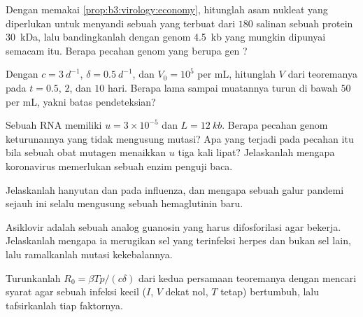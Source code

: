 \begin{exercise}[$\star\star$]\label{exo:b3:virology:5}
Dengan memakai \cref{prop:b3:virology:economy}, hitunglah asam nukleat yang
diperlukan untuk menyandi  sebuah  yang terbuat dari $180$ salinan
sebuah protein \qty{30}{kDa}, lalu bandingkanlah dengan genom \qty{4.5}{kb}
yang mungkin dipunyai  semacam itu. Berapa pecahan genom yang berupa gen
?
\end{exercise}

\begin{exercise}[$\star\star$]\label{exo:b3:virology:6}
Dengan $c = \qty{3}{d^{-1}}$, $\delta = \qty{0.5}{d^{-1}}$, dan $V_{0} =
10^{5}$ per mL, hitunglah $V$ dari teoremanya pada $t = 0.5$, $2$, dan
$10$ hari. Berapa lama sampai muatannya turun di bawah $50$ per mL, yakni batas
pendeteksian?
\end{exercise}

\begin{exercise}[$\star\star$]\label{exo:b3:virology:7}
Sebuah  RNA memiliki $u = 3\times 10^{-5}$ dan $L = \qty{12}{kb}$. Berapa
pecahan genom keturunannya yang tidak mengusung mutasi? Apa yang terjadi pada
pecahan itu bila sebuah obat mutagen menaikkan $u$ tiga kali lipat? Jelaskanlah
mengapa koronavirus memerlukan sebuah enzim penguji baca.
\end{exercise}

\begin{exercise}[$\star\star$]\label{exo:b3:virology:8}
Jelaskanlah hanyutan dan  pada influenza, dan mengapa sebuah
galur pandemi sejauh ini selalu mengusung sebuah hemaglutinin baru.
\end{exercise}

\begin{exercise}[$\star\star$]\label{exo:b3:virology:9}
Asiklovir adalah sebuah analog guanosin yang harus difosforilasi agar bekerja.
Jelaskanlah mengapa ia merugikan sel yang terinfeksi herpes dan bukan sel lain,
lalu ramalkanlah mutasi kekebalannya.
\end{exercise}

\begin{exercise}[$\star\star\star$]\label{exo:b3:virology:10}
Turunkanlah $R_{0} = \beta Tp/(c\delta)$ dari kedua persamaan teoremanya dengan
mencari syarat agar sebuah infeksi kecil ($I$, $V$ dekat nol, $T$ tetap)
bertumbuh, lalu tafsirkanlah tiap faktornya.
\end{exercise}

